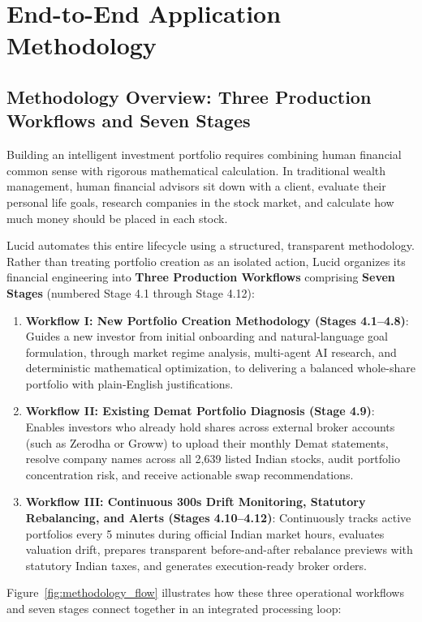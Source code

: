 \chapter{End-to-End Application Methodology}
\label{ch:methodology}

\section{Methodology Overview: Three Production Workflows and Seven Stages}
Building an intelligent investment portfolio requires combining human financial common sense with rigorous mathematical calculation. In traditional wealth management, human financial advisors sit down with a client, evaluate their personal life goals, research companies in the stock market, and calculate how much money should be placed in each stock.

Lucid automates this entire lifecycle using a structured, transparent methodology. Rather than treating portfolio creation as an isolated action, Lucid organizes its financial engineering into \textbf{Three Production Workflows} comprising \textbf{Seven Stages} (numbered Stage 4.1 through Stage 4.12):
\begin{enumerate}
    \item \textbf{Workflow I: New Portfolio Creation Methodology (Stages 4.1--4.8)}: Guides a new investor from initial onboarding and natural-language goal formulation, through market regime analysis, multi-agent AI research, and deterministic mathematical optimization, to delivering a balanced whole-share portfolio with plain-English justifications.
    \item \textbf{Workflow II: Existing Demat Portfolio Diagnosis (Stage 4.9)}: Enables investors who already hold shares across external broker accounts (such as Zerodha or Groww) to upload their monthly Demat statements, resolve company names across all 2,639 listed Indian stocks, audit portfolio concentration risk, and receive actionable swap recommendations.
    \item \textbf{Workflow III: Continuous 300s Drift Monitoring, Statutory Rebalancing, and Alerts (Stages 4.10--4.12)}: Continuously tracks active portfolios every 5 minutes during official Indian market hours, evaluates valuation drift, prepares transparent before-and-after rebalance previews with statutory Indian taxes, and generates execution-ready broker orders.
\end{enumerate}

Figure~\ref{fig:methodology_flow} illustrates how these three operational workflows and seven stages connect together in an integrated processing loop:

